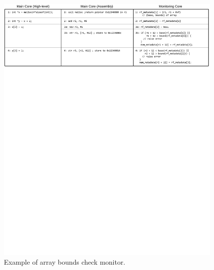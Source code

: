 % 

\begin{figure}
  \begin{center}
    \includegraphics[]{figs/example_full.pdf}
    \vspace{-0.2in}
    \caption{Example of array bounds check monitor.}
    \label{fig:dropping.example_full}
    \vspace{-0.1in}
  \end{center}
\end{figure} 

